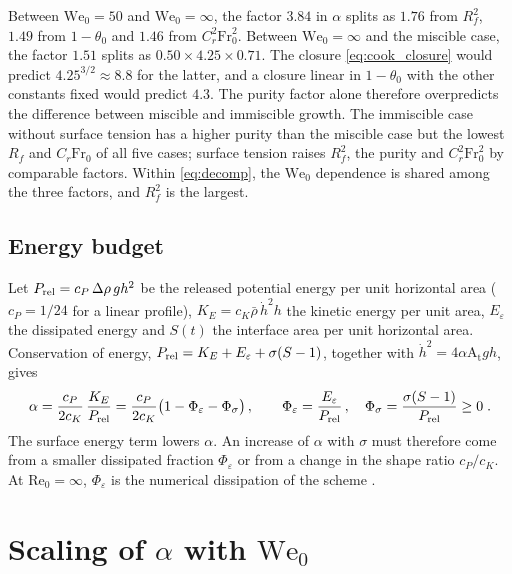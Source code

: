 \documentclass[11pt]{article}
\numberwithin{equation}{section}
\newcommand{\At}{\mathrm{A_t}}
\newcommand{\We}{\mathrm{We}_0}
\newcommand{\hd}{\dot h}
\begin{document}
Between $\We = 50$ and $\We = \infty$, the factor $3.84$ in $\alpha$ splits as $1.76$ from $R_f^2$, $1.49$ from $1 - \theta_0$ and $1.46$ from $C_r^2 \mathrm{Fr}_0^2$. Between $\We = \infty$ and the miscible case, the factor $1.51$ splits as $0.50 \times 4.25 \times 0.71$. The closure \eqref{eq:cook_closure} would predict $4.25^{3/2} \approx 8.8$ for the latter, and a closure linear in $1 - \theta_0$ with the other constants fixed would predict $4.3$. The purity factor alone therefore overpredicts the difference between miscible and immiscible growth. The immiscible case without surface tension has a higher purity than the miscible case but the lowest $R_f$ and $C_r \mathrm{Fr}_0$ of all five cases; surface tension raises $R_f^2$, the purity and $C_r^2 \mathrm{Fr}_0^2$ by comparable factors. Within \eqref{eq:decomp}, the $\We$ dependence is shared among the three factors, and $R_f^2$ is the largest.

\subsection{Energy budget}\label{sec:cook:energy}
Let $P_{\rm rel} = c_P \, \Delta \rho \, g h^2$ be the released potential energy per unit horizontal area ($c_P = 1/24$ for a linear profile), $K_E = c_K \bar\rho \, \hd^2 h$ the kinetic energy per unit area, $E_\varepsilon$ the dissipated energy and $S(t)$ the interface area per unit horizontal area. Conservation of energy, $P_{\rm rel} = K_E + E_\varepsilon + \sigma(S - 1)$, together with $\hd^2 = 4 \alpha \At g h$, gives
\begin{equation}\label{eq:energy}
\alpha = \frac{c_P}{2 c_K} \, \frac{K_E}{P_{\rm rel}} = \frac{c_P}{2 c_K} \big(1 - \Phi_\varepsilon - \Phi_\sigma\big) \, , \qquad
\Phi_\varepsilon = \frac{E_\varepsilon}{P_{\rm rel}} \, , \quad \Phi_\sigma = \frac{\sigma(S - 1)}{P_{\rm rel}} \ge 0 \;.
\end{equation}
The surface energy term lowers $\alpha$. An increase of $\alpha$ with $\sigma$ must therefore come from a smaller dissipated fraction $\Phi_\varepsilon$ or from a change in the shape ratio $c_P/c_K$. At $\mathrm{Re}_0 = \infty$, $\Phi_\varepsilon$ is the numerical dissipation of the scheme \cite{Cook2007,Brill2025}.

\section{Scaling of \texorpdfstring{$\alpha$}{alpha} with \texorpdfstring{$\We$}{We0}}\label{sec:scaling}
\end{document}
